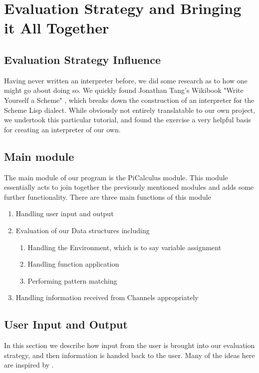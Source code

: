 \section{Evaluation Strategy and Bringing it All Together}
\label{sec:main}
\subsection{Evaluation Strategy Influence}
Having never written an interpreter before, we did some research as to how one might go about doing so. We quickly found Jonathan Tang's Wikibook "Write Yourself a Scheme" \cite{wyas}, which breaks down the construction of an interpreter for the Scheme Lisp dialect. While obviously not entirely translatable to our own project, we undertook this particular tutorial, and found the exercise a very helpful basis for creating an interpreter of our own.

\subsection{Main module}
The main module of our program is the PiCalculus module. This module essentially acts to join together the previously mentioned modules and adds some further functionality. 
There are three main functions of this module
\begin{enumerate}
    \item Handling user input and output
    \item Evaluation of our Data structures including
        \begin{enumerate}
            \item Handling the Environment, which is to say variable assignment
            \item Handling function application
            \item Performing pattern matching
        \end{enumerate}
    \item Handling information received from Channels appropriately
\end{enumerate}

\subsection{User Input and Output}

In this section we describe how input from the user is brought into our evaluation strategy, and then information is handed back to the user. Many of the ideas here are inspired by \cite{wywas}.

